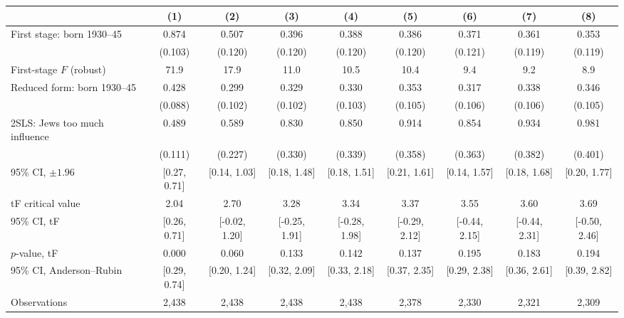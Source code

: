 \begin{tabular}{lcccccccc}
\toprule
 & (1) & (2) & (3) & (4) & (5) & (6) & (7) & (8) \\
\midrule
First stage: born 1930--45 & 0.874 & 0.507 & 0.396 & 0.388 & 0.386 & 0.371 & 0.361 & 0.353 \\
 & (0.103) & (0.120) & (0.120) & (0.120) & (0.120) & (0.121) & (0.119) & (0.119) \\
First-stage $F$ (robust) & 71.9 & 17.9 & 11.0 & 10.5 & 10.4 & 9.4 & 9.2 & 8.9 \\
Reduced form: born 1930--45 & 0.428 & 0.299 & 0.329 & 0.330 & 0.353 & 0.317 & 0.338 & 0.346 \\
 & (0.088) & (0.102) & (0.102) & (0.103) & (0.105) & (0.106) & (0.106) & (0.105) \\
\midrule
2SLS: Jews too much influence & 0.489 & 0.589 & 0.830 & 0.850 & 0.914 & 0.854 & 0.934 & 0.981 \\
 & (0.111) & (0.227) & (0.330) & (0.339) & (0.358) & (0.363) & (0.382) & (0.401) \\
95\% CI, $\pm 1.96$ & [0.27, 0.71] & [0.14, 1.03] & [0.18, 1.48] & [0.18, 1.51] & [0.21, 1.61] & [0.14, 1.57] & [0.18, 1.68] & [0.20, 1.77] \\
tF critical value & 2.04 & 2.70 & 3.28 & 3.34 & 3.37 & 3.55 & 3.60 & 3.69 \\
95\% CI, tF & [0.26, 0.71] & [-0.02, 1.20] & [-0.25, 1.91] & [-0.28, 1.98] & [-0.29, 2.12] & [-0.44, 2.15] & [-0.44, 2.31] & [-0.50, 2.46] \\
$p$-value, tF & 0.000 & 0.060 & 0.133 & 0.142 & 0.137 & 0.195 & 0.183 & 0.194 \\
95\% CI, Anderson--Rubin & [0.29, 0.74] & [0.20, 1.24] & [0.32, 2.09] & [0.33, 2.18] & [0.37, 2.35] & [0.29, 2.38] & [0.36, 2.61] & [0.39, 2.82] \\
\midrule
Observations & 2,438 & 2,438 & 2,438 & 2,438 & 2,378 & 2,330 & 2,321 & 2,309 \\
\bottomrule
\end{tabular}
